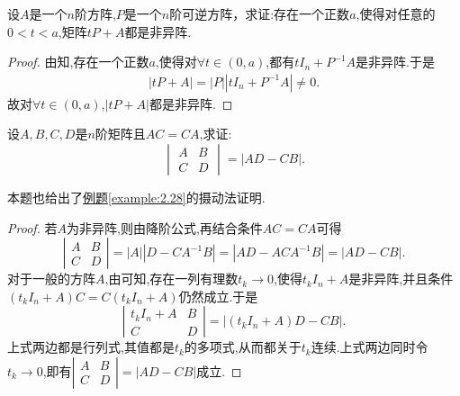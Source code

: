 \documentclass[../../main.tex]{subfiles}%
\begin{document}
\begin{corollary}\label{corollary:矩阵可逆摄动的推论}
设\(A\)是一个\(n\)阶方阵,$P$是一个$n$阶可逆方阵，求证:存在一个正数\(a\),使得对任意的\(0 < t < a\),矩阵\(tP+A\)都是非异阵. 
\end{corollary}
\begin{proof}

由知,存在一个正数$a$,使得对$\forall t\in (0,a)$,都有$tI_n+P^{-1}A$是非异阵.于是
\begin{align*}
|tP+A|=|P||tI_n+P^{-1}A|\ne 0.
\end{align*}
故对$\forall t\in (0,a)$,$|tP+A|$都是非异阵.

\end{proof}

\begin{example}
设\(A,B,C,D\)是\(n\)阶矩阵且\(AC = CA\),求证:
\[
\begin{vmatrix}
A & B\\
C & D
\end{vmatrix}=|AD - CB|.
\]
\end{example}
\begin{note}
本题也给出了\hyperref[example:2.28]{例题\ref{example:2.28}}的摄动法证明.
\end{note}
\begin{proof}

若\(A\)为非异阵,则由降阶公式,再结合条件\(AC = CA\)可得
\[
\left|\begin{matrix}
A & B\\
C & D
\end{matrix}\right| = |A|\left|D - CA^{-1}B\right| = \left|AD - ACA^{-1}B\right| = |AD - CB|.
\]
对于一般的方阵\(A\),由可知,存在一列有理数\(t_k\rightarrow 0\),使得\(t_kI_n + A\)是非异阵,并且条件\((t_kI_n + A)C = C(t_kI_n + A)\)仍然成立.于是
\[
\left|\begin{matrix}
t_kI_n + A & B\\
C & D
\end{matrix}\right| = \left|(t_kI_n + A)D - CB\right|.
\]
上式两边都是行列式,其值都是\(t_k\)的多项式,从而都关于\(t_k\)连续.上式两边同时令\(t_k\rightarrow 0\),即有\(\left|\begin{matrix}
A & B\\
C & D
\end{matrix}\right| = |AD - CB|\)成立.

\end{proof}
\end{document}
